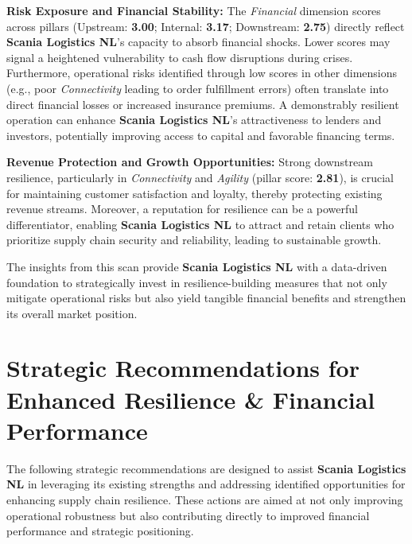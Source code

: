 \documentclass[
  oneside,
  open=any,
  fontsize=11pt]{scrbook}
\begin{document}
\textbf{Risk Exposure and Financial Stability:} The \emph{Financial}
dimension scores across pillars (Upstream: \textbf{3.00}; Internal:
\textbf{3.17}; Downstream: \textbf{2.75}) directly reflect
\textbf{Scania Logistics NL}'s capacity to absorb financial shocks.
Lower scores may signal a heightened vulnerability to cash flow
disruptions during crises. Furthermore, operational risks identified
through low scores in other dimensions (e.g., poor \emph{Connectivity}
leading to order fulfillment errors) often translate into direct
financial losses or increased insurance premiums. A demonstrably
resilient operation can enhance \textbf{Scania Logistics NL}'s
attractiveness to lenders and investors, potentially improving access to
capital and favorable financing terms.

\textbf{Revenue Protection and Growth Opportunities:} Strong downstream
resilience, particularly in \emph{Connectivity} and \emph{Agility}
(pillar score: \textbf{2.81}), is crucial for maintaining customer
satisfaction and loyalty, thereby protecting existing revenue streams.
Moreover, a reputation for resilience can be a powerful differentiator,
enabling \textbf{Scania Logistics NL} to attract and retain clients who
prioritize supply chain security and reliability, leading to sustainable
growth.

The insights from this scan provide \textbf{Scania Logistics NL} with a
data-driven foundation to strategically invest in resilience-building
measures that not only mitigate operational risks but also yield
tangible financial benefits and strengthen its overall market position.

\chapter{Strategic Recommendations for Enhanced Resilience \& Financial
Performance}\label{strategic-recommendations-for-enhanced-resilience-financial-performance}

The following strategic recommendations are designed to assist
\textbf{Scania Logistics NL} in leveraging its existing strengths and
addressing identified opportunities for enhancing supply chain
resilience. These actions are aimed at not only improving operational
robustness but also contributing directly to improved financial
performance and strategic positioning.
\end{document}

